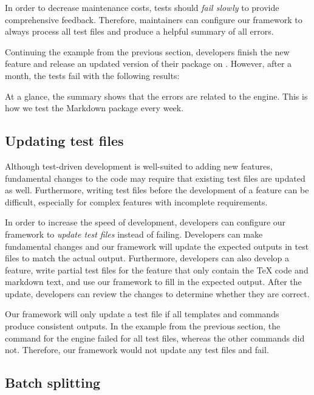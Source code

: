 \documentclass[final]{ltugboat}
\begin{document}
In order to decrease maintenance costs, tests should \emph{fail slowly} to provide comprehensive feedback. Therefore, maintainers can configure our framework to always process all test files and produce a helpful summary of all errors.

Continuing the example from the previous section, developers finish the new feature and release an updated version of their package on . However, after a month, the tests fail with the following results:

\medskip
\noindent
\begingroup
\centering

\par
\endgroup

\medskip
\noindent
At a glance, the summary shows that the errors are related to the  engine. This is how we test the Markdown package every week.

\subsection{Updating test files}
\label{sec:updating-test-files}

Although test-driven development is well-suited to adding new features, fundamental changes to the code may require that existing test files are updated as well. Furthermore, writing test files before the development of a feature can be difficult, especially for complex features with incomplete requirements.

In order to increase the speed of development, developers can configure our framework to \emph{update test files} instead of failing. Developers can make fundamental changes and our framework will update the expected outputs in test files to match the actual output. Furthermore, developers can also develop a feature, write partial test files for the feature that only contain the \TeX{} code and markdown text, and use our framework to fill in the expected output. After the update, developers can review the changes to determine whether they are correct.

Our framework will only update a test file if all templates and commands produce consistent outputs. In the example from the previous section, the command for the  engine failed for all test files, whereas the other commands did not. Therefore, our framework would not update any test files and fail.

\subsection{Batch splitting}
\end{document}
